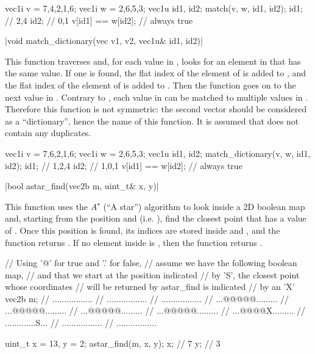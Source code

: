 \begin{example}
\begin{cppcode}
vec1i v = {7,4,2,1,6};
vec1i w = {2,6,5,3};
vec1u id1, id2;
match(v, w, id1, id2);
id1; // {2,4}
id2; // {0,1}
v[id1] == w[id2]; // always true
\end{cppcode}
\end{example}

\funcitem \cppinline|void match_dictionary(vec v1, v2, vec1u& id1, id2)| 

This function traverses  and, for each value in , looks for an element in  that has the same value. If one is found, the flat index of the element of  is added to , and the flat index of the element of  is added to . Then the function goes on to the next value in . Contrary to , each value in  can be matched to multiple values in . Therefore this function is not symmetric: the second vector should be considered as a ``dictionary'', hence the name of this function. It is assumed that  does not contain any duplicates.

\begin{example}
\begin{cppcode}
vec1i v = {7,6,2,1,6};
vec1i w = {2,6,5,3};
vec1u id1, id2;
match_dictionary(v, w, id1, id2);
id1; // {1,2,4}
id2; // {1,0,1}
v[id1] == w[id2]; // always true
\end{cppcode}
\end{example}

\funcitem \cppinline|bool astar_find(vec2b m, uint_t& x, y)| 

This function uses the $A^\star$ (``A star'') algorithm to look inside a 2D boolean map  and, starting from the position  and  (i.e. ), find the closest point that has a value of \cpptrue. Once this position is found, its indices are stored inside  and , and the function returns \cpptrue. If no element inside  is \cpptrue, then the function returns \cppfalse.

\begin{example}
\begin{cppcode}
// Using '@' for true and '.' for false,
// assume we have the following boolean map,
// and that we start at the position indicated
// by 'S', the closest point whose coordinates
// will be returned by astar_find is indicated
// by an 'X'
vec2b m;
// .................
// .................
// .................
// ...@@@@@.........
// ...@@@@@.........
// ...@@@@@.........
// ...@@@@@.........
// ...@@@@X.........
// .............S...
// .................
// .................

uint_t x = 13, y = 2;
astar_find(m, x, y);
x; // 7
y; // 3
\end{cppcode}
\end{example}
